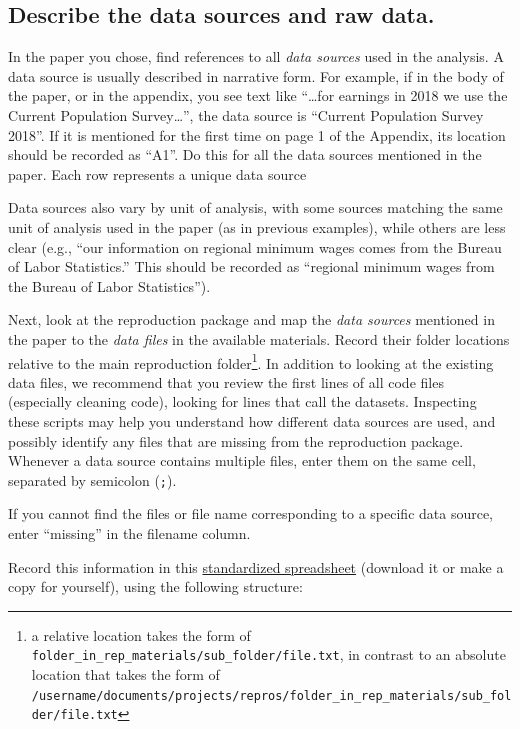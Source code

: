 \documentclass[]{book}
\begin{document}
\hypertarget{desc-sourc}{%
\subsection{Describe the data sources and raw data.}\label{desc-sourc}}

In the paper you chose, find references to all \emph{data sources} used in the analysis. A data source is usually described in narrative form. For example, if in the body of the paper, or in the appendix, you see text like ``\ldots{}for earnings in 2018 we use the Current Population Survey\ldots{}'', the data source is ``Current Population Survey 2018''. If it is mentioned for the first time on page 1 of the Appendix, its location should be recorded as ``A1''. Do this for all the data sources mentioned in the paper. Each row represents a unique data source

Data sources also vary by unit of analysis, with some sources matching the same unit of analysis used in the paper (as in previous examples), while others are less clear (e.g., ``our information on regional minimum wages comes from the Bureau of Labor Statistics.'' This should be recorded as ``regional minimum wages from the Bureau of Labor Statistics'').

Next, look at the reproduction package and map the \emph{data sources} mentioned in the paper to the \emph{data files} in the available materials. Record their folder locations relative to the main reproduction folder\footnote{a relative location takes the form of \texttt{folder\_in\_rep\_materials/sub\_folder/file.txt}, in contrast to an absolute location that takes the form of \texttt{/username/documents/projects/repros/folder\_in\_rep\_materials/sub\_folder/file.txt}}. In addition to looking at the existing data files, we recommend that you review the first lines of all code files (especially cleaning code), looking for lines that call the datasets. Inspecting these scripts may help you understand how different data sources are used, and possibly identify any files that are missing from the reproduction package. Whenever a data source contains multiple files, enter them on the same cell, separated by semicolon (\texttt{;}).

If you cannot find the files or file name corresponding to a specific data source, enter ``missing'' in the filename column.

Record this information in this \href{https://docs.google.com/spreadsheets/d/1LUIdVFH0OfR70C7z07TYeE-uWzKI_JIeWUMaYhqEKK0/edit\#gid=0\&range=A1}{standardized spreadsheet} (download it or make a copy for yourself), using the following structure:\\
\end{document}
